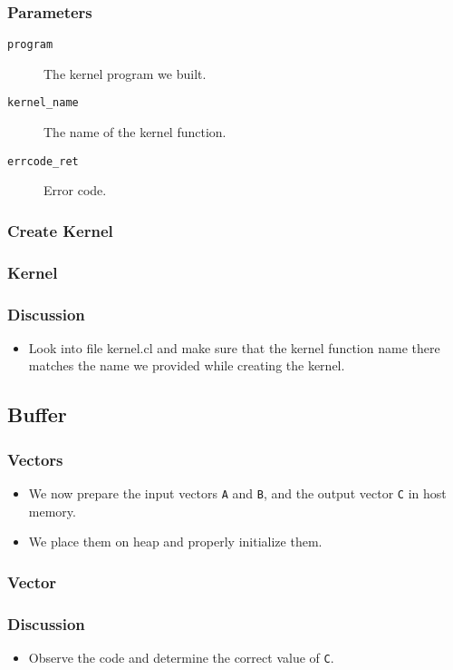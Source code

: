 \documentclass{beamer}
\begin{document}
\begin{frame}
  \frametitle{Parameters}
  \begin{description}
  \item [\tt program] The kernel program we built.
  \item [\tt kernel\_name] The name of the kernel function.
  \item [\tt errcode\_ret] Error code.
  \end{description}
\end{frame}

\begin{frame}
  \frametitle{Create Kernel}
\end{frame}

\begin{frame}
  \frametitle{Kernel}
  \centerline{}
\end{frame}

\begin{frame}
  \frametitle{Discussion}
  \begin{itemize}
  \item Look into file kernel.cl and make sure that the kernel
    function name there matches the name we provided while creating
    the kernel.
  \end{itemize}
\end{frame}

\subsection{Buffer}

\begin{frame}
  \frametitle{Vectors}
  \begin{itemize}
  \item We now prepare the input vectors {\tt A} and {\tt B}, and
    the output vector {\tt C} in host memory.
  \item We place them on heap and properly initialize them.
  \end{itemize}
\end{frame}

\begin{frame}
  \frametitle{Vector}
\end{frame}

\begin{frame}
  \frametitle{Discussion}
  \begin{itemize}
    \item Observe the code and determine the correct value of {\tt C}.
  \end{itemize}
\end{frame}
\end{document}
